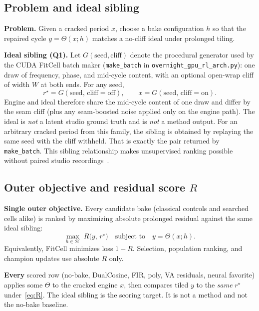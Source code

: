 \subsection{Problem and ideal sibling}
\label{sec:ideal-tile}

\textbf{Problem.} Given a cracked period $x$, choose a bake configuration $h$ so that the repaired cycle $y=\Theta(x;h)$ matches a no-cliff ideal under prolonged tiling.

\textbf{Ideal sibling (Q1).}
Let $G(\mathrm{seed},\mathrm{cliff})$ denote the procedural generator used by the CUDA FitCell batch maker
(\texttt{make\_batch} in \texttt{overnight\_gpu\_rl\_arch.py}): one draw of frequency, phase, and mid-cycle content, with an optional open-wrap cliff of width $W$ at both ends.
For any seed,
\begin{equation}
\label{eq:G-siblings}
r^{\star}=G(\mathrm{seed},\,\mathrm{cliff{=}off}),\qquad
x=G(\mathrm{seed},\,\mathrm{cliff{=}on}).
\end{equation}
Engine and ideal therefore share the mid-cycle content of one draw and differ by the seam cliff (plus any seam-boosted noise applied only on the engine path).
The ideal is \emph{not} a latent studio ground truth and is \emph{not} a method output.
For an arbitrary cracked period from this family, the sibling is obtained by replaying the same seed with the cliff withheld.
That is exactly the pair returned by \texttt{make\_batch}.
This sibling relationship makes unsupervised ranking possible without paired studio recordings~\cite{lehtinen2018,kashyap2021n2n}.

\subsection{Outer objective and residual score $R$}
\label{sec:residual-score}

\textbf{Single outer objective.}
Every candidate bake (classical controls and searched cells alike) is ranked by maximizing absolute prolonged residual against the same ideal sibling:
\begin{equation}
\label{eq:outer-obj}
\max_{h\in\mathcal{H}}\; R\bigl(y,\,r^{\star}\bigr)
\quad\text{subject to}\quad
y=\Theta(x;h).
\end{equation}
Equivalently, FitCell minimizes loss $1-R$. Selection, population ranking, and champion updates use absolute $R$ only.

\textbf{Every} scored row (no-bake, DualCosine, FIR, poly, VA residuals, neural favorite) applies some $\Theta$ to the cracked engine $x$, then compares tiled $y$ to the \emph{same} $r^{\star}$ under~\eqref{eq:R}.
The ideal sibling is the scoring target.
It is not a method and not the no-bake baseline.

